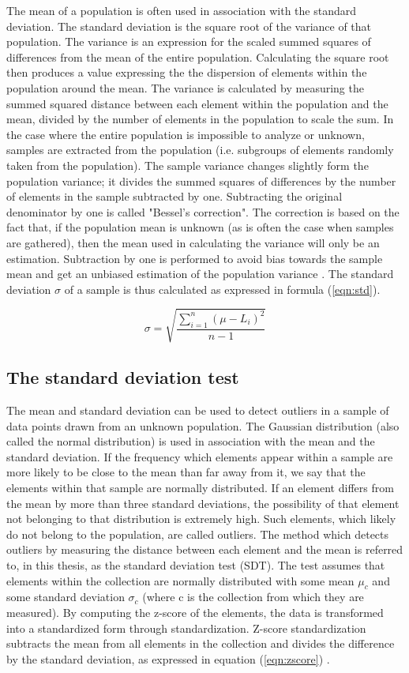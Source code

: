 The mean of a population is often used in association with the standard deviation. The standard deviation is the square root of the variance of that population. The variance is an expression for the scaled summed squares of differences from the mean of the entire population. Calculating the square root then produces a value expressing the the dispersion of elements within the population around the mean. The variance is calculated by measuring the summed squared distance between each element within the population and the mean, divided by the number of elements in the population to scale the sum. In the case where the entire population is impossible to analyze or unknown, samples are extracted from the population (i.e. subgroups of elements randomly taken from the population). The sample variance changes slightly form the population variance; it divides the summed squares of differences by the number of elements in the sample subtracted by one. Subtracting the original denominator by one is called "Bessel's correction". The correction is based on the fact that, if the population mean is unknown (as is often the case when samples are gathered), then the mean used in calculating the variance will only be an estimation. Subtraction by one is performed to avoid bias towards the sample mean and get an unbiased estimation of the population variance \cite{so2008sample, nobach2020practical}. The standard deviation $\sigma$ of a sample is thus calculated as expressed in formula (\ref{eqn:std}).

\begin{equation}
\label{eqn:std}
 \sigma = \sqrt{\frac{\sum_{i = 1}^{n} (\mu - L_i)^2}{n-1}}
\end{equation}


\subsection{The standard deviation test}
The mean and standard deviation can be used to detect outliers in a sample of data points drawn from an unknown population. The Gaussian distribution (also called the normal distribution) is used in association with the mean and the standard deviation. If the frequency which elements appear within a sample are more likely to be close to the mean than far away from it, we say that the elements within that sample are normally distributed. If an element differs from the mean by more than three standard deviations, the possibility of that element not belonging to that distribution is extremely high. Such elements, which likely do not belong to the population, are called outliers. The method which detects outliers by measuring the distance between each element and the mean is referred to, in this thesis, as the standard deviation test (SDT). The test assumes that elements within the collection are normally distributed with some mean $\mu_c$ and some standard deviation $\sigma_c$ (where c is the collection from which they are measured). By computing the z-score of the elements, the data is transformed into a standardized form through standardization. Z-score standardization subtracts the mean from all elements in the collection and divides the difference by the standard deviation, as expressed in equation (\ref{eqn:zscore}) \cite{geary1935ratio}.

